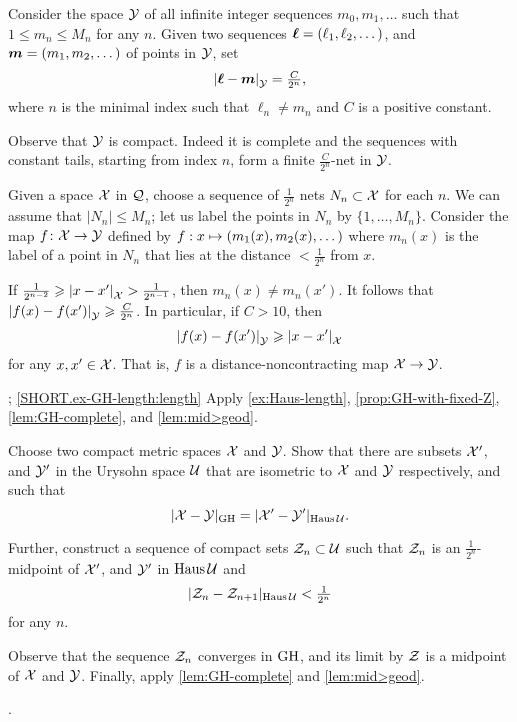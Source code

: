 Consider the space $\mathcal{Y}$ of all infinite integer sequences $m_0,m_1,\dots$ such that $1\le m_n\le M_n$ for any $n$.
Given two sequences $\bm{\ell}\z=(\ell_1,\ell_2,\dots)$, and $\bm{m}\z=(m_1,m_2,\dots)$ of points in $\mathcal{Y}$, set 
\[\dist{\bm{\ell}}{\bm{m}}{\spc{Y}}=\tfrac C{2^{n}},\]
where $n$ is the minimal index such that $\ell_n\ne m_n$ and $C$ is a positive constant.

Observe that $\mathcal{Y}$ is compact.
Indeed it is complete and the sequences with constant tails, starting from index $n$, form a finite $\tfrac C{2^{n}}$-net in $\mathcal{Y}$.

Given a space $\mathcal{X}$ in $\mathcal{Q}$,
choose a sequence of $\tfrac1{2^n}$ nets 
$N_n\subset\mathcal{X}$ for each $n$.
We can assume that $|N_n|\le M_n$; let us label the points in $N_n$ by $\{1,\dots,M_n\}$.
Consider the map $f\colon\mathcal{X}\to\mathcal{Y}$ defined by $f:x\z\mapsto (m_1(x),m_2(x),\dots)$ where $m_n(x)$ is the label of a point in $N_n$ that lies at the distance $<\tfrac1{2^n}$ from $x$.

If $\tfrac1{2^{n-2}}\ge \dist{x}{x'}{\spc{X}}>\tfrac1{2^{n-1}}$, then $m_n(x)\ne m_n(x')$.
It follows that $\dist{f(x)}{f(x')}{\spc{Y}}\ge \tfrac C{2^{n}}$.
In particular, if $C>10$, then 
\[\dist{f(x)}{f(x')}{\spc{Y}}\ge \dist{x}{x'}{\spc{X}}\]
for any $x,x'\in \mathcal{X}$.
That is, $f$ is a distance-noncontracting map $\mathcal{X}\to \mathcal{Y}$.

\parbf{\ref{ex-GH-length}}; \ref{SHORT.ex-GH-length:length}
Apply
\ref{ex:Haus-length},
\ref{prop:GH-with-fixed-Z},
\ref{lem:GH-complete},
and \ref{lem:mid>geod}.

Choose two compact metric spaces $\mathcal{X}$ and $\mathcal{Y}$.
Show that there are subsets $\mathcal{X}'$, and $\mathcal{Y}'$ in the Urysohn space $\mathcal{U}$ that are isometric to $\mathcal{X}$ and $\mathcal{Y}$ respectively, and such that 
\[|\mathcal{X}-\mathcal{Y}|_{\operatorname{\rm GH}\nolimits} = |\mathcal{X}'-\mathcal{Y}'|_{\operatorname{\rm Haus}\nolimits\mathcal{U}}.\]

Further, construct a sequence of compact sets $\mathcal{Z}_n\subset \mathcal{U}$ such that $\mathcal{Z}_n$ is an $\tfrac1{2^n}$-midpoint of $\mathcal{X}'$, and $\mathcal{Y}'$ in $\operatorname{\rm Haus}\nolimits\mathcal{U}$ and 
\[|\mathcal{Z}_n-\mathcal{Z}_{n+1}|_{\operatorname{\rm Haus}\nolimits\mathcal{U}}<\tfrac1{2^n}\]
for any $n$.

Observe that the sequence $\mathcal{Z}_n$ converges in $\operatorname{\rm GH}\nolimits$, and its limit by $\mathcal{Z}$ is a midpoint of $\mathcal{X}$ and $\mathcal{Y}$.
Finally, apply \ref{lem:GH-complete} and \ref{lem:mid>geod}.

 \cite{ivanov-nikolaeva-tuzhilin}.

